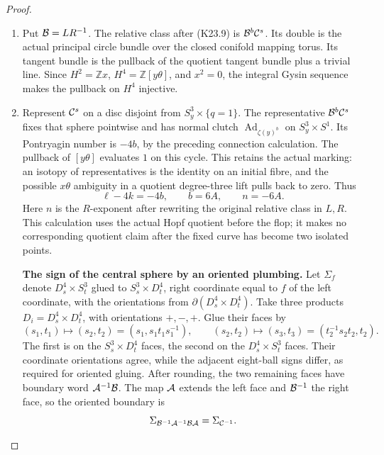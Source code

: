\begin{proof}
\begin{enumerate}[label=\arabic*.]
\item Put \({\cal B}=LR^{-1}\). The relative class after (K23.9) is
\({\cal B}^b{\cal C}^s\). Its double is the actual principal circle
bundle over the closed conifold mapping torus. Its tangent bundle
is the pullback of the quotient tangent bundle plus a trivial
line. Since \(H^2=\mathbb Zx\), \(H^4=\mathbb Z[y\theta]\), and
\(x^2=0\), the integral Gysin sequence makes the pullback on \(H^4\)
injective.

\item Represent \({\cal C}^s\) on a disc disjoint from
\(S^3_y\times\{q=1\}\). The representative
\({\cal B}^b{\cal C}^s\) fixes that sphere pointwise and has
normal clutch \(\operatorname{Ad}_{\zeta(y)^b}\) on
\(S^3_y\times S^1\). Its Pontryagin number is \(-4b\), by the
preceding connection calculation. The pullback of \([y\theta]\)
evaluates \(1\) on this cycle. This retains the actual marking:
an isotopy of representatives is the identity on an initial fibre,
and the possible \(x\theta\) ambiguity in a quotient degree-three
lift pulls back to zero. Thus
\[
 \ell-4k=-4b,\qquad b=6A,\qquad n=-6A.              \tag{K23.10}
\]
Here \(n\) is the \(R\)-exponent after rewriting the original
relative class in \(L,R\). This calculation uses the actual Hopf
quotient before the flop; it makes no corresponding quotient claim
after the fixed curve has become two isolated points.

\par\medskip\noindent\textbf{The sign of the central sphere by an oriented plumbing.}\enspace
Let \(\Sigma_f\) denote \(D^4_s\times S^3_t\) glued to
\(S^3_s\times D^4_t\), right coordinate equal to \(f\) of the left
coordinate, with the orientations from
\(\partial(D^4_s\times D^4_t)\). Take three products
\(D_i=D^4_s\times D^4_t\), with orientations \(+,-,+\).
Glue their faces by
\[
 (s_1,t_1)\longmapsto(s_2,t_2)
       =(s_1,s_1t_1s_1^{-1}),\qquad
 (s_2,t_2)\longmapsto(s_3,t_3)
       =(t_2^{-1}s_2t_2,t_2).
\]
The first is on the \(S^3_s\times D^4_t\) faces, the second on the
\(D^4_s\times S^3_t\) faces. Their coordinate orientations agree,
while the adjacent eight-ball signs differ, as required for oriented
gluing. After rounding, the two remaining faces have boundary word
\({\cal A}^{-1}{\cal B}\). The map \({\cal A}\) extends the left
face and \({\cal B}^{-1}\) the right face, so the oriented boundary is
\[
 \Sigma_{{\cal B}^{-1}{\cal A}^{-1}{\cal B}{\cal A}}
                       =\Sigma_{{\cal C}^{-1}}.
\]


\end{enumerate}
\end{proof}
